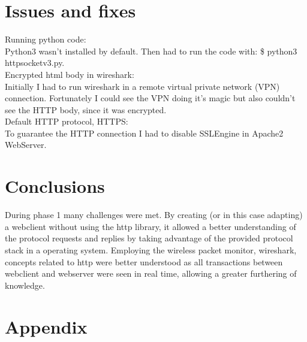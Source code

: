 \documentclass[11pt,a4paper]{report}
\begin{document}
\chapter{Issues and fixes}
    Running python code: \\
        \hspace*{10mm}Python3 wasn't installed by default. Then had to run the code with: \$ python3 httpsocketv3.py. \\
    Encrypted html body in wireshark: \\
        \hspace*{10mm}Initially I had to run wireshark in a remote virtual private network (VPN) connection. Fortunately I could see the VPN doing it's magic but also couldn't see the HTTP body, since it was encrypted. \\
    Default HTTP protocol, HTTPS: \\
        \hspace*{10mm}To guarantee the HTTP connection I had to disable SSLEngine in Apache2 WebServer. \\

\chapter{Conclusions}
During phase 1 many challenges were met.
By creating (or in this case adapting) a webclient without using the http library, it allowed a better understanding of the protocol requests and replies by taking advantage of the provided protocol stack in a operating system.
Employing the wireless packet monitor, wireshark, concepts related to http were better understood as all transactions between webclient and webserver were seen in real time, allowing a greater furthering of knowledge.

%
%

\appendix
\chapter{Appendix}
\end{document}
